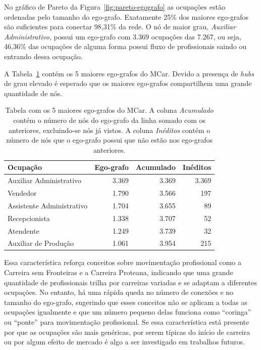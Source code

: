 \documentclass[12pt,a4paper]{article}
\begin{document}
No gráfico de Pareto da Figura~\ref{fig:pareto-egografo} as ocupações estão ordenadas pelo tamanho do ego-grafo. Exatamente 25\% dos maiores ego-grafos são suficientes para conectar 98,31\% da rede. O nó de maior grau, \textit{Auxiliar Administrativo}, possui um ego-grafo com 3.369 ocupações das 7.267, ou seja, 46,36\% das ocupações de alguma forma possui fluxo de profissionais saindo ou entrando dessa ocupação.

A Tabela~\ref{tab:top-egografos} contém os 5 maiores ego-grafos do MCar. Devido a presença de \textit{hubs} de grau elevado é esperado que os maiores ego-grafos compartilhem uma grande quantidade de nós.

\begin{table}[ht]
    \centering
    \begin{tabular}{@{} l r r r @{}}
        \toprule
        Ocupação                  & Ego-grafo & Acumulado & Inéditos \\
        \midrule
        Auxiliar Administrativo   & 3.369    & 3.369     & 3.369    \\
        Vendedor                  & 1.790    & 3.566     & 197      \\
        Assistente Administrativo & 1.704    & 3.655     & 89       \\
        Recepcionista                & 1.338    & 3.707     & 52       \\
        Atendente                      & 1.249    & 3.739     & 32       \\
        Auxiliar de Produção      & 1.061    & 3.954     & 215      \\
        \bottomrule
    \end{tabular}
    \caption{Tabela com os 5 maiores ego-grafos do MCar. A coluna \textit{Acumulado} contém o número de nós do ego-grafo da linha somado com os anteriores, excluindo-se nós já vistos. A coluna \textit{Inéditos} contém o número de nós que o ego-grafo possui que não estão nos ego-grafos anteriores.}
    \label{tab:top-egografos}
\end{table}

Essa característica reforça conceitos sobre movimentação profissional como a Carreira sem Fronteiras e a Carreira Proteana, indicando que uma grande quantidade de profissionais trilha por carreiras variadas e se adaptam a diferentes ocupações. No entanto, há uma rápida queda no número de conexões e no tamanho do ego-grafo, sugerindo que esses conceitos não se aplicam a todas as ocupações igualmente e que um número pequeno delas funciona como \enquote{coringa} ou \enquote{ponte} para movimentação profissional. Se essa característica está presente por que as ocupações são mais genéricas, por serem típicas do início de carreira ou por algum efeito de mercado é algo a ser investigado em trabalhos futuros.
\end{document}
